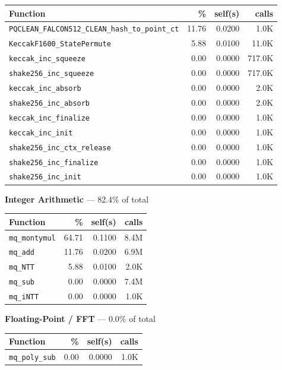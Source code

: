 \documentclass[11pt,a4paper]{article}
\begin{document}
\begin{longtable}{p{7.5cm}rrr}
\toprule
Function & \% & self(s) & calls \\
\midrule
\endhead
  \texttt{PQCLEAN\_FALCON512\_CLEAN\_hash\_to\_point\_ct} & 11.76 & 0.0200 & 1.0K \\
  \texttt{KeccakF1600\_StatePermute} & 5.88 & 0.0100 & 11.0K \\
  \texttt{keccak\_inc\_squeeze} & 0.00 & 0.0000 & 717.0K \\
  \texttt{shake256\_inc\_squeeze} & 0.00 & 0.0000 & 717.0K \\
  \texttt{keccak\_inc\_absorb} & 0.00 & 0.0000 & 2.0K \\
  \texttt{shake256\_inc\_absorb} & 0.00 & 0.0000 & 2.0K \\
  \texttt{keccak\_inc\_finalize} & 0.00 & 0.0000 & 1.0K \\
  \texttt{keccak\_inc\_init} & 0.00 & 0.0000 & 1.0K \\
  \texttt{shake256\_inc\_ctx\_release} & 0.00 & 0.0000 & 1.0K \\
  \texttt{shake256\_inc\_finalize} & 0.00 & 0.0000 & 1.0K \\
  \texttt{shake256\_inc\_init} & 0.00 & 0.0000 & 1.0K \\
\bottomrule
\end{longtable}

\noindent\colorbox{intcolor}{\strut \textbf{Integer Arithmetic} --- 82.4\% of total}
\vspace{2pt}

\begin{longtable}{p{7.5cm}rrr}
\toprule
Function & \% & self(s) & calls \\
\midrule
\endhead
  \texttt{mq\_montymul} & 64.71 & 0.1100 & 8.4M \\
  \texttt{mq\_add} & 11.76 & 0.0200 & 6.9M \\
  \texttt{mq\_NTT} & 5.88 & 0.0100 & 2.0K \\
  \texttt{mq\_sub} & 0.00 & 0.0000 & 7.4M \\
  \texttt{mq\_iNTT} & 0.00 & 0.0000 & 1.0K \\
\bottomrule
\end{longtable}

\noindent\colorbox{fpcolor}{\strut \textbf{Floating-Point / FFT} --- 0.0\% of total}
\vspace{2pt}

\begin{longtable}{p{7.5cm}rrr}
\toprule
Function & \% & self(s) & calls \\
\midrule
\endhead
  \texttt{mq\_poly\_sub} & 0.00 & 0.0000 & 1.0K \\
\bottomrule
\end{longtable}
\end{document}
